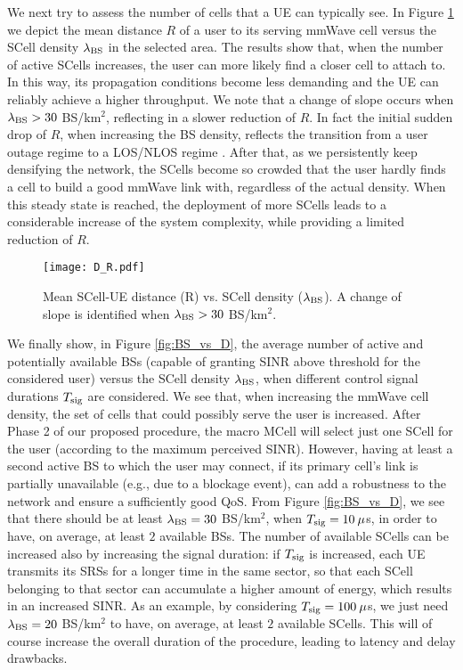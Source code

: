 \documentclass[conference,a4paper]{IEEEtran}
\begin{document}
We next try to assess the number of cells that a UE can typically see.
In Figure  \ref{fig:D_R} we depict the mean distance $R$ of a user to its  serving mmWave cell versus the SCell density $\lambda_{\rm BS}$ in the selected area. The results show that, when the number of active SCells increases, the  user can more likely find a closer cell to attach to. In this way, its propagation conditions become less demanding and the UE can reliably achieve a higher throughput. We note that a change of slope occurs when $\lambda_{\rm BS}>30$ BS/km$^2$, reflecting in a slower reduction of $R$. In fact the initial sudden drop of $R$, when increasing the BS density, reflects the transition from a user outage regime to a LOS/NLOS regime \cite{Mustafa}.
 After that,  as we  persistently keep  densifying the network, the SCells become so crowded that the user hardly  finds a cell to build a good mmWave link with, regardless of the actual density.
  When this steady state is reached, the deployment of more SCells leads to a considerable increase of the system complexity, while providing a limited reduction of $R$.



  \begin{figure}[t!]
\centering
 \texttt{[image: D\_R.pdf]}
 \caption{Mean SCell-UE distance (R) vs. SCell density ($\lambda_{\rm BS}$). A change of slope is identified when $\lambda_{\rm BS}>30$ BS/km$^2$.}
 \label{fig:D_R}
\end{figure}

We finally show, in Figure  \ref{fig:BS_vs_D}, the average number of active and potentially available BSs (capable of granting SINR above threshold for the considered user) versus the SCell density $\lambda_{\rm BS}$, when different control signal durations $T_{\rm sig}$ are considered.
We see that, when increasing the mmWave cell density, the set of cells that could possibly serve the user is increased. After  Phase 2 of our proposed procedure, the macro MCell will select just one SCell for the user (according to the maximum perceived SINR). However, having at least a second active BS  to which the user may connect, if its primary cell's link is partially unavailable (e.g., due to a blockage event), can add a robustness to the network and ensure a sufficiently  good QoS. From Figure \ref{fig:BS_vs_D}, we see that there should be at least $\lambda_{\rm BS}=30$ BS/km$^2$, when $T_{\rm sig} = 10 \: \mu$s, in order to have, on average, at least $2$ available BSs.
The number of available SCells can be increased also by increasing the signal duration: if $T_{\rm sig}$ is increased, each UE transmits its SRSs for a longer time in the same sector, so that each SCell belonging to that sector can accumulate a higher amount of energy, which results in an increased SINR.
As an example, by considering $T_{\rm sig}=100 \: \mu$s, we just need $\lambda_{\rm BS}=20$ BS/km$^2$ to have, on average, at least $2$ available SCells. This will of course increase the overall duration of the  procedure, leading to latency and delay drawbacks.
\end{document}
